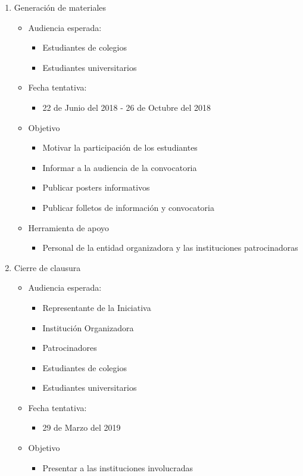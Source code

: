 \documentclass{article}
\begin{document}
\begin{enumerate}
\item Generación de materiales
\begin{itemize}
\item Audiencia esperada:
\begin{itemize}
\item Estudiantes de colegios
\item Estudiantes universitarios
\end{itemize}
\item Fecha tentativa:
\begin{itemize}
\item 22 de Junio del 2018 - 26 de Octubre del 2018
\end{itemize}
\item Objetivo
\begin{itemize}
\item Motivar la participación de los estudiantes
\item Informar a la audiencia de la convocatoria
\item Publicar posters informativos
\item Publicar folletos de información y convocatoria
\end{itemize}
\item Herramienta de apoyo
\begin{itemize}
\item Personal de la entidad organizadora y las instituciones patrocinadoras
\end{itemize}
\end{itemize}
\item Cierre de clausura
\begin{itemize}
\item Audiencia esperada:
\begin{itemize}
\item Representante de la Iniciativa
\item Institución Organizadora
\item Patrocinadores
\item Estudiantes de colegios
\item Estudiantes universitarios
\end{itemize}
\item Fecha tentativa:
\begin{itemize}
\item 29 de Marzo del 2019
\end{itemize}
\item Objetivo
\begin{itemize}
\item Presentar a las instituciones involucradas

\end{itemize}
\end{itemize}
\end{enumerate}
\end{document}
